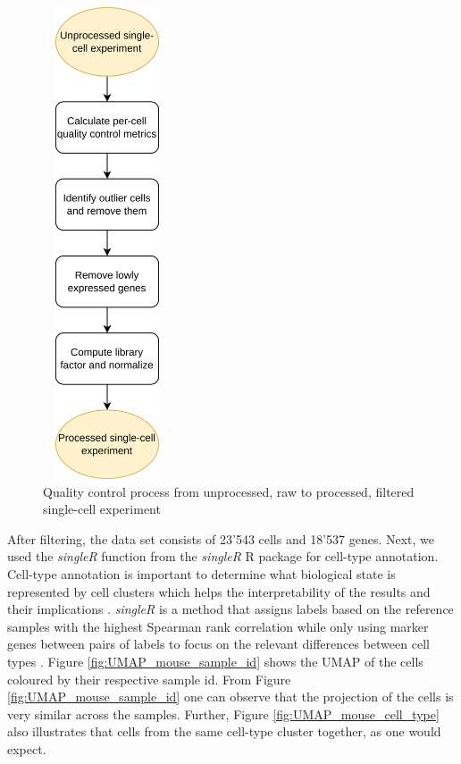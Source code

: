 \begin{figure}[!htb]
\begin{center}
\includegraphics[width=1.5in,height=5.5in]{../figures/qc.png}
\end{center}
\caption{Quality control process from unprocessed, raw to processed, filtered single-cell experiment}
\label{fig:QC}
\end{figure}

After filtering, the data set consists of 23'543 cells and 18'537 genes. Next, we used the \emph{singleR} function from the \emph{singleR} R package \citep{singleR} for cell-type annotation. Cell-type annotation is important to determine what biological state is represented by cell clusters which helps the interpretability of the results and their implications \citep{OSCA}. \emph{singleR} is a method that assigns labels based on the reference samples with the highest Spearman rank correlation while only using marker genes between pairs of labels to focus on the relevant differences between cell types \citep{singleR}. Figure \ref{fig:UMAP_mouse_sample_id} shows the UMAP of the cells coloured by their respective sample id. From Figure \ref{fig:UMAP_mouse_sample_id} one can observe that the projection of the cells is very similar across the samples. Further, Figure \ref{fig:UMAP_mouse_cell_type} also illustrates that cells from the same cell-type cluster together, as one would expect.

